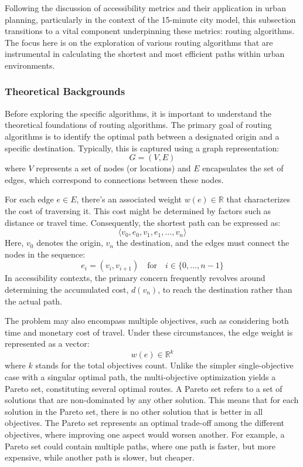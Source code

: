 Following the discussion of accessibility metrics and their application in urban planning, particularly in the context of the 15-minute city model, this subsection transitions to a vital component underpinning these metrics: routing algorithms.
The focus here is on the exploration of various routing algorithms that are instrumental in calculating the shortest and most efficient paths within urban environments. 

\subsubsection{Theoretical Backgrounds}

Before exploring the specific algorithms, it is important to understand the theoretical foundations of routing algorithms.
The primary goal of routing algorithms is to identify the optimal path between a designated origin and a specific destination.
Typically, this is captured using a graph representation:
\[ G = (V, E) \]
where $V$ represents a set of nodes (or locations) and $E$ encapsulates the set of edges, which correspond to connections between these nodes.

For each edge \( e \in E \), there's an associated weight \( w(e) \in \mathbb{R} \) that characterizes the cost of traversing it.
This cost might be determined by factors such as distance or travel time.
Consequently, the shortest path can be expressed as:
\[ \langle v_0, e_0, v_1, e_1, \dots, v_n \rangle \]
Here, \( v_0 \) denotes the origin, \( v_n \) the destination, and the edges must connect the nodes in the sequence:
\[ e_i = (v_i, v_{i+1}) \quad \text{for} \quad i \in \{0, \dots, n-1\} \]
In accessibility contexts, the primary concern frequently revolves around determining the accumulated cost, \( d(v_n) \), to reach the destination rather than the actual path.

The problem may also encompass multiple objectives, such as considering both time and monetary cost of travel.
Under these circumstances, the edge weight is represented as a vector:
\[ w(e) \in \mathbb{R}^k \]
where \( k \) stands for the total objectives count.
Unlike the simpler single-objective case with a singular optimal path, the multi-objective optimization yields a Pareto set, constituting several optimal routes.
A Pareto set refers to a set of solutions that are non-dominated by any other solution.
This means that for each solution in the Pareto set, there is no other solution that is better in all objectives.
The Pareto set represents an optimal trade-off among the different objectives, where improving one aspect would worsen another.
For example, a Pareto set could contain multiple paths, where one path is faster, but more expensive, while another path is slower, but cheaper.

